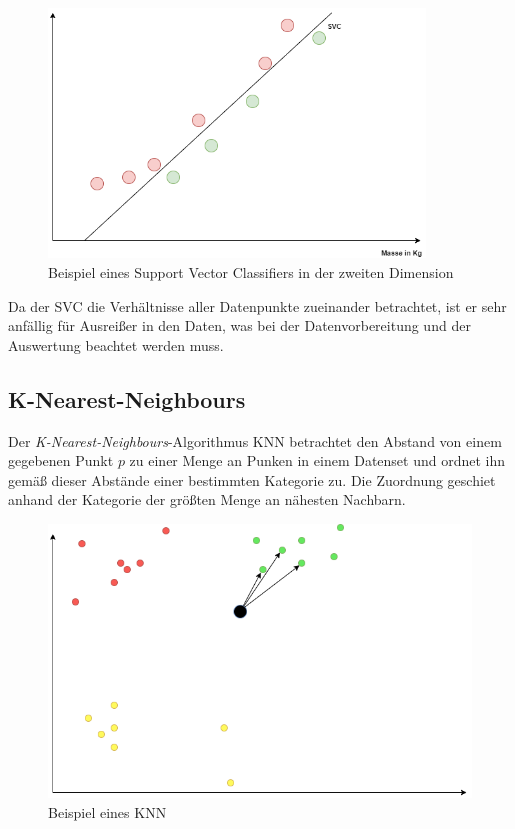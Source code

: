 \begin{figure}[h]
    \centering
    \includegraphics[width=10.0cm]{pic/SVC_2D.png}
    \caption{Beispiel eines Support Vector Classifiers in der zweiten Dimension}
    \label{fig:SVC_2D}
\end{figure}

Da der SVC die Verhältnisse aller Datenpunkte zueinander betrachtet, ist er sehr anfällig für Ausreißer in 
den Daten, was bei der Datenvorbereitung und der Auswertung beachtet werden muss.

\newpage
\subsection{K-Nearest-Neighbours}
Der \textit{K-Nearest-Neighbours}-Algorithmus KNN betrachtet den Abstand von einem gegebenen Punkt $p$ zu einer 
Menge an Punken in einem Datenset und ordnet ihn gemäß dieser Abstände einer bestimmten Kategorie zu. Die 
Zuordnung geschiet anhand der Kategorie der größten Menge an nähesten Nachbarn.

\begin{figure}[h]
    \centering
    \includegraphics[width=12.0cm]{pic/KNN.png}
    \caption{Beispiel eines KNN}
    \label{fig:NN}
\end{figure}

